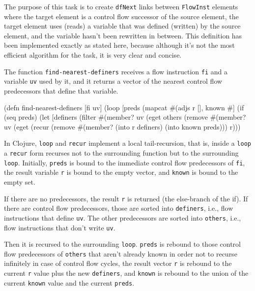\documentclass[submission]{eptcs}
\begin{document}
The purpose of this task is to create \verb|dfNext| links between
\verb|FlowInst| elements where the target element is a control flow successor
of the source element, the target element uses (reads) a variable that was
defined (written) by the source element, and the variable hasn't been rewritten
in between.  This definition has been implemented exactly as stated here,
because although it's not the most efficient algorithm for the task, it is very
clear and concise.

The function \verb|find-nearest-definers| receives a flow instruction \verb|fi|
and a variable \verb|uv| used by it, and it returns a vector of the nearest
control flow predecessors that define that variable.

\begin{clojurecode}
(defn find-nearest-definers [fi uv]
  (loop [preds (mapcat #(adjs %
         r [], known #{}]
    (if (seq preds)
      (let [definers (filter #(member? uv (eget %
            others   (remove #(member? uv (eget %
        (recur (remove #(member? %
               (into r definers) (into known preds)))
      r)))
\end{clojurecode}

In Clojure, \verb|loop| and \verb|recur| implement a local tail-recursion, that
is, inside a \verb|loop| a \verb|recur| form recurses not to the surrounding
function but to the surrounding \verb|loop|.  Initially, \verb|preds| is bound
to the immediate control flow predecessors of \verb|fi|, the result variable
\verb|r| is bound to the empty vector, and \verb|known| is bound to the empty
set.

If there are no predecessors, the result \verb|r| is returned (the else-branch
of the if).  If there are control flow predecessors, those are sorted into
\verb|definers|, i.e., flow instructions that define \verb|uv|.  The other
predecessors are sorted into \verb|others|, i.e., flow instructions that don't
write \verb|uv|.

Then it is recursed to the surrounding \verb|loop|.  \verb|preds| is rebound to
those control flow predecessors of \verb|others| that aren't already known in
order not to recurse infinitely in case of control flow cycles, the result
vector \verb|r| is rebound to the current \verb|r| value plus the new
\verb|definers|, and \verb|known| is rebound to the union of the current
\verb|known| value and the current \verb|preds|.
\end{document}

